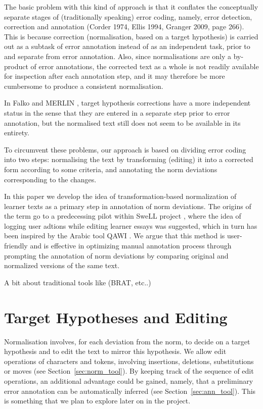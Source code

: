 \documentclass[10pt, a4paper]{article}
\begin{document}
The basic problem with this kind of approach is that it conflates the conceptually separate stages of (traditionally speaking) error coding, namely, error detection, correction and annotation (Corder 1974, Ellis 1994, Granger 2009, page 266). This is because correction (normalisation, based on a target hypothesis) is carried out as a subtask of error annotation instead of as an independent task, prior to and separate from error annotation. Also, since normalisations are only a by-product of error annotations, the corrected text as a whole is not readily available for inspection after each annotation step, and it may therefore be more cumbersome to produce a consistent normalisation.

In Falko \cite{ludeling05multi-levelerror} and MERLIN  \cite{MERLIN2014},
target hypothesis corrections have a more independent status in the sense that they are entered in a separate step prior to error annotation, but the normalised text still does not seem to be available in its entirety.

To circumvent these problems, our approach is based on dividing error coding into two steps: normalising the text by transforming (editing) it into a corrected form according to some criteria, and annotating the norm deviations corresponding to the changes.

In this paper we develop the idea of transformation-based normalization of learner texts as a primary step in annotation of norm deviations. The origins of the term go to a predecessing pilot within SweLL project \cite{correctAnnotator}, where the idea of logging user adtions while editing learner essays was suggested, which in turn has been inspired by the Arabic tool QAWI \cite{QAWI}. We argue that this method is user-friendly and is effective in optimizing manual annotation process through prompting the annotation of norm deviations by comparing original and normalized versions of the same text.

A bit about traditional tools like   (BRAT, etc..)

\section{Target Hypotheses and Editing}

Normalisation involves, for each deviation from the norm, to decide on a target hypothesis and to edit the text to mirror this hypothesis. We allow edit operations of characters and tokens, involving insertions, deletions, substitutions %
or moves (see Section~\ref{sec:norm_tool}). By keeping track of the sequence of edit operations, an additional advantage could be gained, namely, that a preliminary error annotation can be automatically inferred (see Section~\ref{sec:ann_tool}). This is something that we plan to explore later on in the project.
\end{document}
